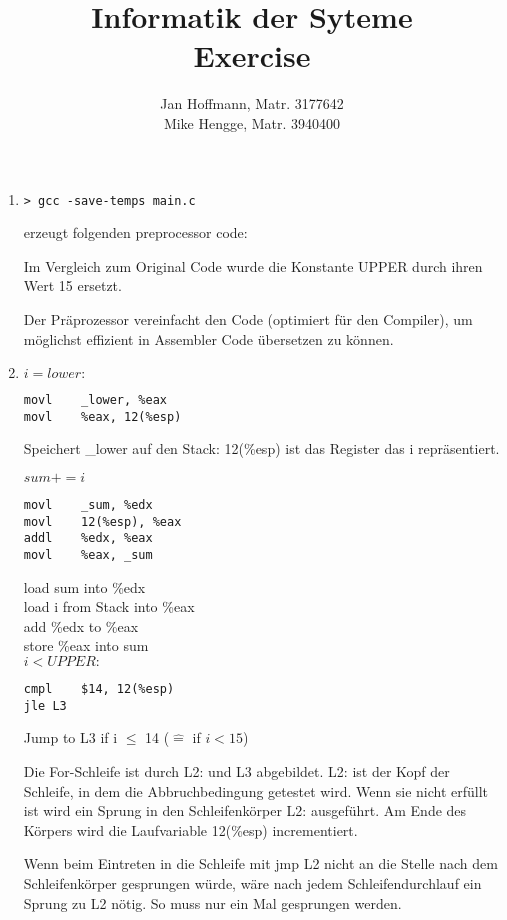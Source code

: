 \documentclass[10pt,a4paper]{article}
\title{Informatik der Syteme \\ Exercise \exnum}
\author{Jan Hoffmann, Matr. 3177642 \\ Mike Hengge,  Matr. 3940400}
\begin{document}
\section{}
	\begin{enumerate}
		\item 		
			\begin{lstlisting}[style=DOS] 
> gcc -save-temps main.c
			\end{lstlisting}
			erzeugt folgenden preprocessor code:
			
		
			Im Vergleich zum Original Code wurde die Konstante UPPER durch ihren Wert 15 ersetzt.
		
			Der Präprozessor vereinfacht den Code (optimiert für den Compiler), um möglichst effizient in Assembler Code übersetzen zu können.
			
		\item 
			$i = lower:$ \\
			\begin{lstlisting}[style=Assembler]
movl	_lower, %eax
movl	%eax, 12(%esp)
			\end{lstlisting}
			Speichert \_lower auf den Stack: 12(\%esp) ist das Register das i repräsentiert.
			
			$sum += i$ \\
			\begin{lstlisting}[style=Assembler]
movl	_sum, %edx
movl	12(%esp), %eax
addl	%edx, %eax
movl	%eax, _sum
			\end{lstlisting}
			load sum into \%edx\\
			load i from Stack into \%eax\\
			add \%edx to \%eax \\
			store \%eax into sum \\
			
			$i < UPPER:$\\
			\begin{lstlisting}[style=Assembler]
cmpl	$14, 12(%esp)
jle	L3			
			\end{lstlisting}
			Jump to L3 if i $\leq$ 14 ($\widehat{=}$ if $i < 15$)
		
			Die For-Schleife ist durch L2: und L3 abgebildet. L2: ist der Kopf der Schleife, in dem die Abbruchbedingung getestet wird. Wenn sie nicht erfüllt ist wird ein Sprung in den Schleifenkörper L2: ausgeführt. Am Ende des Körpers wird die Laufvariable 12(\%esp) incrementiert.
			
			Wenn beim Eintreten in die Schleife mit jmp	L2 nicht an die Stelle nach dem Schleifenkörper gesprungen würde, wäre nach jedem Schleifendurchlauf ein Sprung zu L2 nötig. So muss nur ein Mal gesprungen werden. 
		

\end{enumerate}
\end{document}
